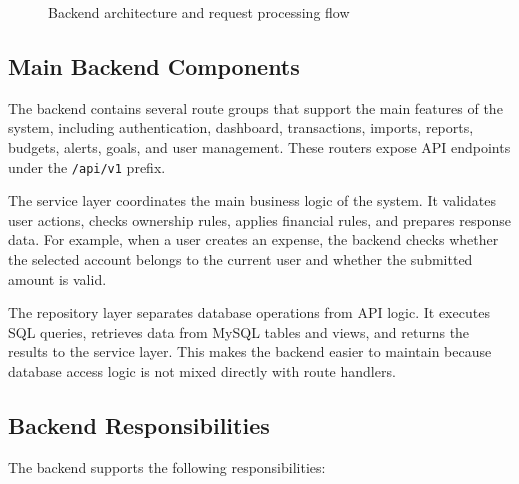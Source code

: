 \documentclass{article}
\begin{document}
\begin{figure}[H]
{
}
\caption{Backend architecture and request processing flow}
\label{fig:backend-architecture-flow}
\end{figure}

\subsection{Main Backend Components}

The backend contains several route groups that support the main features of the system, including authentication, dashboard, transactions, imports, reports, budgets, alerts, goals, and user management. These routers expose API endpoints under the \texttt{/api/v1} prefix.

The service layer coordinates the main business logic of the system. It validates user actions, checks ownership rules, applies financial rules, and prepares response data. For example, when a user creates an expense, the backend checks whether the selected account belongs to the current user and whether the submitted amount is valid.

The repository layer separates database operations from API logic. It executes SQL queries, retrieves data from MySQL tables and views, and returns the results to the service layer. This makes the backend easier to maintain because database access logic is not mixed directly with route handlers.

\subsection{Backend Responsibilities}

The backend supports the following responsibilities:
\end{document}

